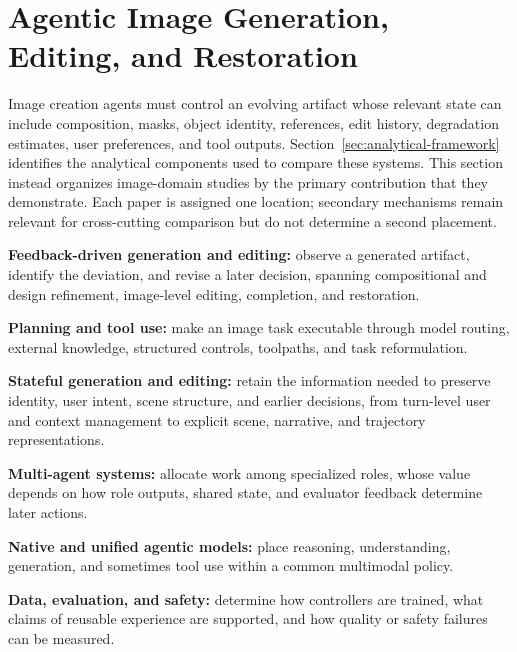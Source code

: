 \section{Agentic Image Generation, Editing, and Restoration}
\label{sec:image-generation}

Image creation agents must control an evolving artifact whose relevant state can include composition, masks, object identity, references, edit history, degradation estimates, user preferences, and tool outputs. Section~\ref{sec:analytical-framework} identifies the analytical components used to compare these systems. This section instead organizes image-domain studies by the primary contribution that they demonstrate. Each paper is assigned one location; secondary mechanisms remain relevant for cross-cutting comparison but do not determine a second placement.

\begin{keytakeaway}
\begin{keypoints}
  \item \textbf{Feedback-driven generation and editing:} observe a generated artifact, identify the deviation, and revise a later decision, spanning compositional and design refinement, image-level editing, completion, and restoration.

  \item \textbf{Planning and tool use:} make an image task executable through model routing, external knowledge, structured controls, toolpaths, and task reformulation.

  \item \textbf{Stateful generation and editing:} retain the information needed to preserve identity, user intent, scene structure, and earlier decisions, from turn-level user and context management to explicit scene, narrative, and trajectory representations.

  \item \textbf{Multi-agent systems:} allocate work among specialized roles, whose value depends on how role outputs, shared state, and evaluator feedback determine later actions.

  \item \textbf{Native and unified agentic models:} place reasoning, understanding, generation, and sometimes tool use within a common multimodal policy.

  \item \textbf{Data, evaluation, and safety:} determine how controllers are trained, what claims of reusable experience are supported, and how quality or safety failures can be measured.
\end{keypoints}
\end{keytakeaway}

